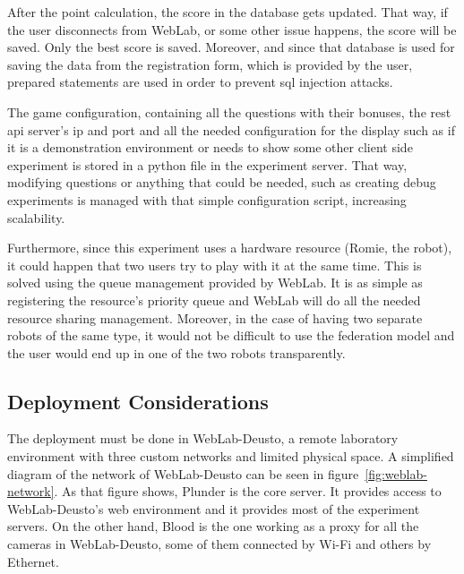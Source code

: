 After the point calculation, the score in the database gets updated. That way, if the user
disconnects from WebLab, or some other issue happens, the score will be saved. Only the best score
is saved. Moreover, and since that database is used for saving the data from the registration form,
which is provided by the user, prepared statements are used in order to prevent \acrshort{sql}
injection attacks.

The game configuration, containing all the questions with their bonuses, the \acrshort{rest}
\acrshort{api} server's \acrshort{ip} and port and all the needed configuration for the display such
as if it is a demonstration environment or needs to show some other client side experiment is stored
in a python file in the experiment server. That way, modifying questions or anything that could be
needed, such as creating debug experiments is managed with that simple configuration script,
increasing scalability.

Furthermore, since this experiment uses a hardware resource (Romie, the robot), it could happen that
two users try to play with it at the same time. This is solved using the queue management provided
by WebLab. It is as simple as registering the resource's priority queue and WebLab will do all the
needed resource sharing management. Moreover, in the case of having two separate robots of the same
type, it would not be difficult to use the federation model and the user would end up in one of the
two robots transparently.

\subsection{Deployment Considerations}

The deployment must be done in WebLab-Deusto, a remote laboratory environment with three custom
networks and limited physical space. A simplified diagram of the network of WebLab-Deusto can be
seen in figure~\ref{fig:weblab-network}. As that figure shows, Plunder is the core server. It
provides access to WebLab-Deusto's web environment and it provides most of the experiment servers.
On the other hand, Blood is the one working as a proxy for all the cameras in WebLab-Deusto, some of
them connected by Wi-Fi and others by Ethernet.

